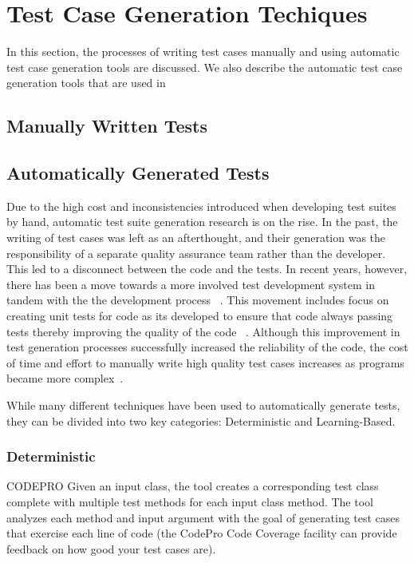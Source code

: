 
\section{Test Case Generation Techiques}
\label{sec:background}
In this section, the processes of writing test cases manually and using automatic test case generation tools are discussed.  We also describe the automatic test case generation tools that are used in 

\subsection{Manually Written Tests}


\subsection{Automatically Generated Tests}
Due to the high cost and inconsistencies introduced when developing test suites by hand, automatic test suite generation research is on the rise.  In the past, the writing of test cases was left as an afterthought, and their generation was the responsibility of a separate quality assurance team rather than the developer.  This led to a disconnect between the code and the tests.  In recent years, however, there has been a move towards a more involved test development system in tandem with the the development process ~\cite{Gelperin:1988:GST:62959.62965}.  This movement includes focus on creating unit tests for code as its developed to ensure that code always passing tests thereby improving the quality of the code ~\cite{Canfora:2006:EAT:1159733.1159788}.  Although this improvement in test generation processes successfully increased the reliability of the code, the cost of time and effort to manually write high quality test cases increases as programs became more complex~\cite{clarke1998automated}. 

While many different techniques have been used to automatically generate tests, they can be divided into two key categories: Deterministic and Learning-Based.

\subsubsection{Deterministic}

CODEPRO  Given an input class, the tool creates a corresponding test class complete with multiple test methods for each input class method. The tool analyzes each method and input argument with the goal of generating test cases that exercise each line of code (the CodePro Code Coverage facility can provide feedback on how good your test cases are).


